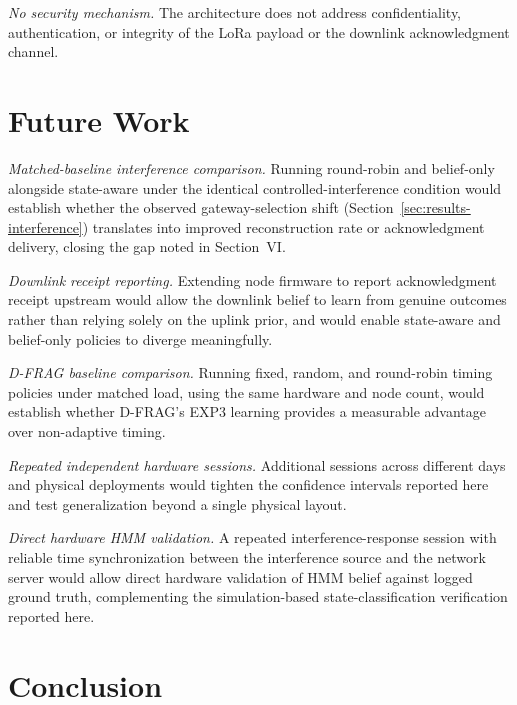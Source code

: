 \documentclass[journal]{IEEEtran}
\begin{document}
\textit{No security mechanism.} The architecture does not address confidentiality, authentication, or integrity of the LoRa payload or the downlink acknowledgment channel.

\section{Future Work}

\textit{Matched-baseline interference comparison.} Running round-robin and belief-only alongside state-aware under the identical controlled-interference condition would establish whether the observed gateway-selection shift (Section~\ref{sec:results-interference}) translates into improved reconstruction rate or acknowledgment delivery, closing the gap noted in Section~VI.

\textit{Downlink receipt reporting.} Extending node firmware to report acknowledgment receipt upstream would allow the downlink belief to learn from genuine outcomes rather than relying solely on the uplink prior, and would enable state-aware and belief-only policies to diverge meaningfully.

\textit{D-FRAG baseline comparison.} Running fixed, random, and round-robin timing policies under matched load, using the same hardware and node count, would establish whether D-FRAG's EXP3 learning provides a measurable advantage over non-adaptive timing.

\textit{Repeated independent hardware sessions.} Additional sessions across different days and physical deployments would tighten the confidence intervals reported here and test generalization beyond a single physical layout.

\textit{Direct hardware HMM validation.} A repeated interference-response session with reliable time synchronization between the interference source and the network server would allow direct hardware validation of HMM belief against logged ground truth, complementing the simulation-based state-classification verification reported here.

\section{Conclusion}
\end{document}
